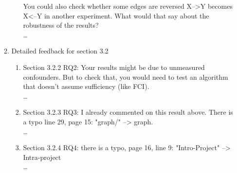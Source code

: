 \documentclass[]{svjour3}
\begin{document}
\begin{enumerate}
\begin{enumerate}
\begin{enumerate}
You could also check whether some edges are reversed X-->Y becomes X<--Y in another experiment. What would that say about the robustness of the results?\\{\MARK \dots}
\end{enumerate}
\item Detailed feedback for section 3.2
\begin{enumerate}
    \item Section 3.2.2 RQ2: Your results might be due to unmeasured confounders. But to check that, you would need to test an algorithm that doesn't assume sufficiency (like FCI).\\{\MARK \dots}
    \item Section 3.2.3 RQ3: I already commented on this result above.
There is a typo line 29, page 15: "graph/" --> graph.\\{\MARK \dots}
    \item Section 3.2.4 RQ4:
there is a typo, page 16, line 9: "Intro-Project" --> Intra-project\\{\MARK \dots}
\end{enumerate}


\end{enumerate}
\end{enumerate}
\end{document}
